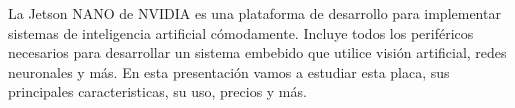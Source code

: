 La Jetson NANO de NVIDIA es una plataforma de desarrollo para implementar sistemas de inteligencia artificial cómodamente. Incluye todos los periféricos necesarios para desarrollar un sistema embebido que utilice visión artificial, redes neuronales y más. En esta presentación vamos a estudiar esta placa, sus principales caracteristicas, su uso, precios y más.